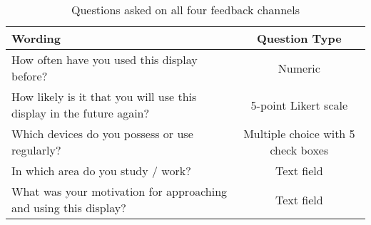 \begin{table}[h]
\begin{tabular}{lc}
\textbf{Wording}                                                     & \textbf{Question Type} \\ \hline
How often have you used this display before?                         & Numeric                \\
How likely is it that you will use this display in the future again? & 5-point Likert scale   \\
Which devices do you possess or use regularly?                       & Multiple choice with 5 check boxes                        \\
In which area do you study / work?                                   & Text field             \\
What was your motivation for approaching and using this display?     & Text field            
\end{tabular}
\label{table:5-questions-asked}
\caption[Questions asked]{Questions asked on all four feedback channels}
\end{table}